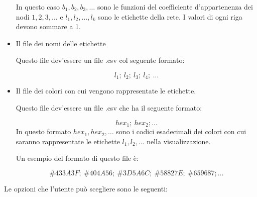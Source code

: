 \documentclass[a4paper,12pt]{report}
\begin{document}
\begin{itemize}
				In questo caso $b_1, b_2, b_3, \dots$ sono le funzioni del coefficiente d'appartenenza dei nodi $1, 2, 3, \dots$ e $l_1, l_2, \dots, l_k$ sono le etichette della rete. I valori di ogni riga devono sommare a 1. 
				

				\item Il file dei nomi delle etichette
				
				Questo file dev'essere un file .csv col seguente formato: 

				\begin{equation}
				l_1;\ l_2;\ l_3;\ l_4;\ \dots
				\end{equation}

				\item Il file dei colori con cui vengono rappresentate le etichette. 

				Questo file dev'essere un file .csv che ha il seguente formato: 

				\begin{equation}
				hex_1;\ hex_2; \dots
				\end{equation}
				In questo formato $hex_1, hex_2, \dots$ sono i codici esadecimali dei colori con cui saranno rappresentate le etichette $l_1, l_2, \dots$ nella visualizzazione. 

				Un esempio del formato di questo file è: 

				\begin{equation}
				\#433A3F;\ \#404A56;\ \#3D5A6C;\ \#58827E;\ \#659687; \dots
				\end{equation}
			\end{itemize}
			
			Le opzioni che l'utente può scegliere sono le seguenti:
			
\end{document}
